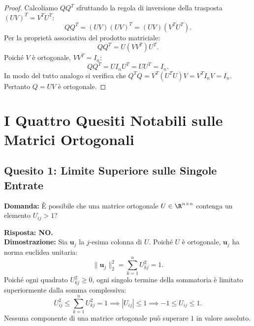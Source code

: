 \begin{proof}
Calcoliamo $Q Q^T$ sfruttando la regola di inversione della trasposta $(UV)^T = V^T U^T$:
\begin{equation}
    Q Q^T = (UV)(UV)^T = (UV)(V^T U^T).
\end{equation}
Per la propriet\`a associativa del prodotto matriciale:
\begin{equation}
    Q Q^T = U (V V^T) U^T.
\end{equation}
Poich\'e $V$ \`e ortogonale, $V V^T = I_n$:
\begin{equation}
    Q Q^T = U I_n U^T = U U^T = I_n.
\end{equation}
In modo del tutto analogo si verifica che $Q^T Q = V^T (U^T U) V = V^T I_n V = I_n$. Pertanto $Q = UV$ \`e ortogonale.
\end{proof}

\FloatBarrier
\section{I Quattro Quesiti Notabili sulle Matrici Ortogonali}

\subsection{Quesito 1: Limite Superiore sulle Singole Entrate}

\begin{example}
\textbf{Domanda:} \`E possibile che una matrice ortogonale $U \in \R^{n \times n}$ contenga un elemento $U_{ij} > 1$?

\textbf{Risposta: NO.} \\
\textbf{Dimostrazione:} Sia $\mathbf{u}_j$ la $j$-esima colonna di $U$. Poich\'e $U$ \`e ortogonale, $\mathbf{u}_j$ ha norma euclidea unitaria:
\begin{equation}
    \|\mathbf{u}_j\|_2^2 = \sum_{k=1}^n U_{kj}^2 = 1.
\end{equation}
Poich\'e ogni quadrato $U_{kj}^2 \ge 0$, ogni singolo termine della sommatoria \`e limitato superiormente dalla somma complessiva:
\begin{equation}
    U_{ij}^2 \le \sum_{k=1}^n U_{kj}^2 = 1 \implies |U_{ij}| \le 1 \implies -1 \le U_{ij} \le 1.
\end{equation}
Nessuna componente di una matrice ortogonale pu\`o superare $1$ in valore assoluto.
\end{example}

